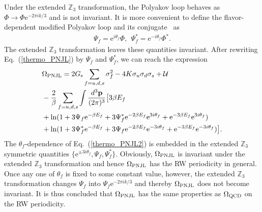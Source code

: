 \documentclass[prd,superscriptaddress,unsortedaddress,
twocolumn,showpacs,preprintnumbers,amsmath,amssymb]{revtex4}
\begin{document}
 Under the extended $\mathbb{Z}_{3}$ transformation,
 the Polyakov loop behaves as $\Phi\rightarrow \Phi\textrm{e}^{-2\pi ik/3}$
 and is not invariant.
 It is more convenient to define the
 flavor-dependent modified Polyakov loop and
 its conjugate~\cite{Sakai_JPhys} as
 \begin{eqnarray}
  \Psi_{f}=\textrm{e}^{i\theta_{f}}\Phi,\ \ \Psi^{\ast}_{f}=\textrm{e}^{-i\theta_{f}}\Phi^{\ast}.
 \end{eqnarray}
 The extended $\mathbb{Z}_{3}$ transformation
 leaves these quantities invariant.
 After rewriting Eq.~(\ref{thermo_PNJL}) by $\Psi_{f}$ and $\Psi^{\ast}_{f}$,
 we can reach the expression
   \begin{align}
   &\Omega_{\rm PNJL}=
   2G_{\rm s}\sum_{f=u,d,s}\sigma^2_{f}
   -4K\sigma_{u}\sigma_{d}\sigma_{s}
   +\mathcal{U}
   \notag \\
   &-\frac{2}{\beta}\sum_{f=u,d,s}\int\frac{d^3\mathbf{p}}{(2\pi)^3}
   \bigl[
   3\beta E_{f}
   \notag \\
   &+
   \ln(1+3\Psi_{f}\textrm{e}^{-\beta E_{f}}
   +3\Psi^{\ast}_{f}\textrm{e}^{-2\beta E_{f}}\textrm{e}^{3i\theta_{f}}
    +\textrm{e}^{-3\beta E_{f}}\textrm{e}^{3i\theta_{f}})
    \notag \\
   &+
   \ln(1+3\Psi^{\ast}_{f}\textrm{e}^{-\beta E_{f}}
   +3\Psi_{f}\textrm{e}^{-2\beta E_{f}}\textrm{e}^{-3i\theta_{f}}
   +\textrm{e}^{-3\beta E_{f}}\textrm{e}^{-3i\theta_{f}})
   \bigr].
   \label{thermo_PNJL2}
   \end{align}
   The $\theta_{f}$-dependence of Eq.~(\ref{thermo_PNJL2}) is
   embedded in the extended $\mathbb{Z}_{3}$ symmetric quantities
   $\{\textrm{e}^{\pm 3i\theta_{f}},\Psi_{f},\Psi^{\ast}_{f}\}$.
   Obviously, $\Omega_{\rm PNJL}$ is invariant
   under the extended $\mathbb{Z}_{3}$ transformation
   and hence $\Omega_{\rm PNJL}$ has the RW periodicity in general.
   Once any one of $\theta_{f}$ is fixed to some constant value,
   however,
   the extended $\mathbb{Z}_{3}$ transformation
   changes $\Psi_{f}$ into $\Psi_{f}\textrm{e}^{-2\pi ik/3}$
   and thereby $\Omega_{\rm PNJL}$ does not become invariant.
   It is thus concluded that
   $\Omega_{\rm PNJL}$ has the same properties as $\Omega_{\rm QCD}$
   on the RW periodicity.

   
\end{document}
